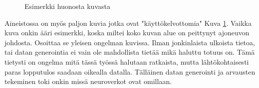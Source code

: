 \begin{figure}[h]
\centering
{}
\caption{Esimerkki huonosta kuvasta}
\label{fig:extreme}
\end{figure}

    
Aineistossa on myös paljon kuvia jotka ovat "käyttökelvottomia" Kuva \ref{fig:extreme}.
Vaikka kuva onkin ääri esimerkki, koska miltei koko kuvan alue on peittynyt ajoneuvon johdosta.
Osoittaa se yleisen ongelman kuvissa. 
Ilman jonkinlaista ulkoista tietoa, tai datan generointia ei vain ole mahdollista tietää mikä haluttu totuus on.
Tämä tietysti on ongelma mitä tässä työssä halutaan ratkaista,
mutta lähtökohtaisesti paras lopputulos saadaan oikealla datalla.
Tälläinen datan generointi ja arvausten tekeminen toki onkin missä neuroverkot ovat omillaan.

